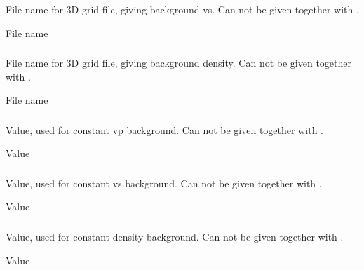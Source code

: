 \subsubsection{}
 \slist
   \item \Description File name for 3D grid file, giving background vs. Can not be given together with .
   \item \Argument File name
   \item \Default
 \elist

\subsubsection{}
 \slist
   \item \Description File name for 3D grid file, giving background density. Can not be given together with .
   \item \Argument File name
   \item \Default
 \elist

\subsubsection{}
 \slist
   \item \Description Value, used for constant vp background. Can not be given together with .
   \item \Argument Value
   \item \Default
 \elist

\subsubsection{}
 \slist
   \item \Description Value, used for constant vs background. Can not be given together with .
   \item \Argument Value
   \item \Default
 \elist

\subsubsection{}
 \slist
   \item \Description Value, used for constant density background. Can not be given together with .
   \item \Argument Value
   \item \Default
 \elist

